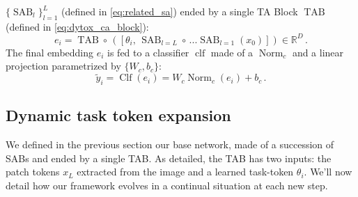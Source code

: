 $\{\operatorname{SAB}_l\}_{l=1}^{L}$ (defined in \autoref{eq:related_sa}) ended by a single TA Block
$\operatorname{TAB}$ (defined in \autoref{eq:dytox_ca_block}):
%
\begin{equation}
    e_i = \operatorname{TAB} \circ\, ([\theta_i,\, \operatorname{SAB}_{l=L} \circ\, ... \operatorname{SAB}_{l=1}(x_0)]) \in \mathbb{R}^D\,.
    \label{eq:dytox_cab_sab}
\end{equation}
%
The final embedding $e_i$ is fed to a classifier $\operatorname{clf}$ made of a
$\operatorname{Norm}_c$ and a linear projection parametrized by $\{W_c, b_c\}$:
%
\begin{equation}
    \tilde{y}_i = \operatorname{Clf}(e_i) = W_c \operatorname{Norm}_c(e_i) + b_c\,.
\end{equation}

\subsection{Dynamic task token expansion}
\label{sec:dytox_ensembling_tab}
We defined in the previous section our base network, made of a succession of SABs and ended by a
single TAB. As detailed, the TAB has two inputs: the patch tokens $x_L$ extracted from the image and
a learned task-token $\theta_i$. We'll now detail how our framework evolves in a continual situation
at each new step.

